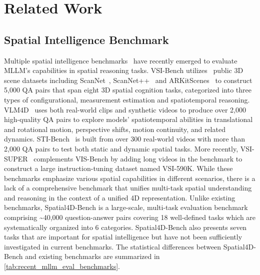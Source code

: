 \section{Related Work}
\label{sec:related_works}


\subsection{Spatial Intelligence Benchmark}
Multiple spatial intelligence benchmarks~\cite{Yang_2025_CVPR,yu2025far,liu2025mirage,gong2025space,deng2025internspatial,yang2025mmsi,ma20243dsrbench,cheng2024spatialrgpt,zhao2025mmvu,tang2025lego} have recently emerged to evaluate MLLM's capabilities in spatial reasoning tasks.
VSI-Bench utilizes~\cite{Yang_2025_CVPR} public 3D scene datasets including ScanNet~\cite{dai2017scannet}, ScanNet++~\cite{yeshwanth2023scannet++} and ARKitScenes~\cite{baruch2021arkitscenes} to construct 5,000 QA pairs that span eight 3D spatial cognition tasks, categorized into three types of configurational, measurement estimation and spatiotemporal reasoning.
VLM4D~\cite{zhou2025vlm4d} uses both real-world clips and synthetic videos to produce over 2,000 high-quality QA pairs to explore models' spatiotemporal abilities in translational and rotational motion, perspective shifts, motion continuity, and related dynamics.
STI-Bench~\cite{li2025sti} is built from over 300 real-world videos with more than 2,000 QA pairs to test both static and dynamic spatial tasks.
More recently, VSI-SUPER~\cite{yang2025cambrian} complements VIS-Bench by adding long videos in the benchmark to construct a large instruction-tuning dataset named VSI-590K.
While these benchmarks emphasize various spatial capabilities in different scenarios, there is a lack of a comprehensive benchmark that unifies multi-task spatial understanding and reasoning in the context of a unified 4D representation.
Unlike existing benchmarks, Spatial4D-Bench is a large-scale, multi-task evaluation benchmark comprising \textasciitilde40,000 question-answer pairs covering 18 well-defined tasks which are systematically organized into 6 categories.
Spatial4D-Bench also presents seven tasks that are important for spatial intelligence but have not been sufficiently investigated in current benchmarks.
The statistical differences between Spatial4D-Bench and existing benchmarks are summarized in \cref{tab:recent_mllm_eval_benchmarks}.



